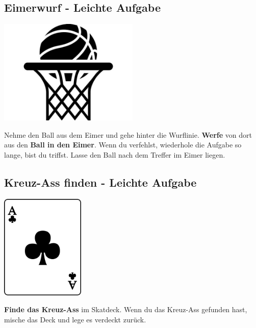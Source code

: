 \subsection{Eimerwurf - Leichte Aufgabe}
\vfill
\begin{center}
    \includegraphics[height=5cm]{graphics/basketball.png}
\end{center}
\vfill
Nehme den Ball aus dem Eimer und gehe hinter die Wurflinie.
\textbf{Werfe} von dort aus den \textbf{Ball in den Eimer}.
Wenn du verfehlst, wiederhole die Aufgabe so lange, bist du triffst.
Lasse den Ball nach dem Treffer im Eimer liegen.
\newline
\newpage

\subsection{Kreuz-Ass finden - Leichte Aufgabe}
\vfill
\begin{center}
    \includegraphics[height=5cm]{graphics/cross_ace.png}
\end{center}
\vfill
\textbf{Finde das Kreuz-Ass} im Skatdeck.
Wenn du das Kreuz-Ass gefunden hast, mische das Deck und lege es verdeckt
zurück.
\newline
\newpage

